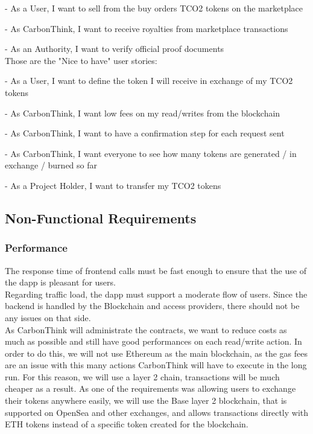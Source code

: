 \documentclass[a4paper, 12pt]{article}
\begin{document}
- As a User, I want to sell from the buy orders TCO2 tokens on the marketplace

- As CarbonThink, I want to receive royalties from marketplace transactions

- As an Authority, I want to verify official proof documents \\

Those are the "Nice to have" user stories:

- As a User, I want to define the token I will receive in exchange of my TCO2 tokens

- As CarbonThink, I want low fees on my read/writes from the blockchain

- As CarbonThink, I want to have a confirmation step for each request sent

- As CarbonThink, I want everyone to see how many tokens are generated / in exchange / burned so far

- As a Project Holder, I want to transfer my TCO2 tokens


\subsection{Non-Functional Requirements}
\subsubsection{Performance}

The response time of frontend calls must be fast enough to ensure that the use of the dapp is pleasant for users.\\

Regarding traffic load, the dapp must support a moderate flow of users. Since the backend is handled by the Blockchain and access providers, there should not be any issues on that side.\\

As CarbonThink will administrate the contracts, we want to reduce costs as much as possible and still have good performances on each read/write action. In order to do this, we will not use Ethereum as the main blockchain, as the gas fees are an issue with this many actions CarbonThink will have to execute in the long run. For this reason, we will use a layer 2 chain, transactions will be much cheaper as a result. As one of the requirements was allowing users to exchange their tokens anywhere easily, we will use the Base layer 2 blockchain, that is supported on OpenSea and other exchanges, and allows transactions directly with ETH tokens instead of a specific token created for the blockchain.
\end{document}
